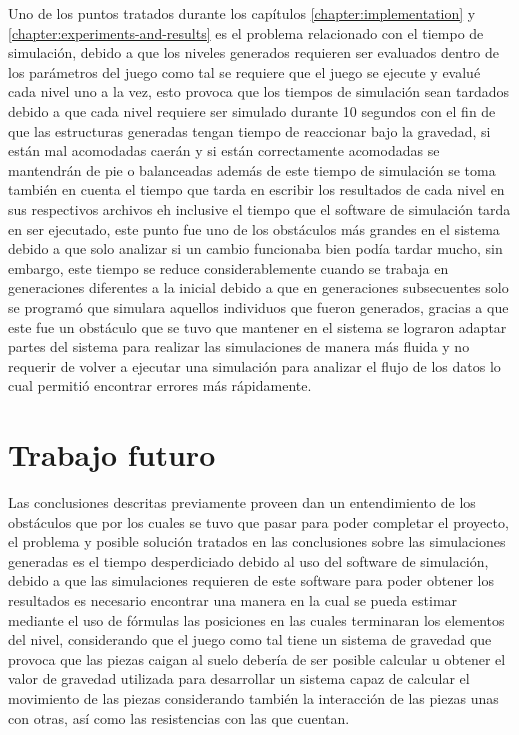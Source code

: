 Uno de los puntos tratados durante los capítulos \ref{chapter:implementation}
y \ref{chapter:experiments-and-results} es el problema relacionado con el tiempo
de simulación, debido a que los niveles generados requieren ser evaluados dentro
de los parámetros del juego como tal se requiere que el juego se ejecute y
evalué cada nivel uno a la vez, esto provoca que los tiempos de simulación sean
tardados debido a que cada nivel requiere ser simulado durante 10 segundos con
el fin de que las estructuras generadas tengan tiempo de reaccionar bajo la
gravedad, si están mal acomodadas caerán y si están correctamente acomodadas se
mantendrán de pie o balanceadas además de este tiempo de simulación se toma
también en cuenta el tiempo que tarda en escribir los resultados de cada nivel
en sus respectivos archivos eh inclusive el tiempo que el software de simulación
tarda en ser ejecutado, este punto fue uno de los obstáculos más grandes en el
sistema debido a que solo analizar si un cambio funcionaba bien podía tardar
mucho, sin embargo, este tiempo se reduce considerablemente cuando se trabaja en
generaciones diferentes a la inicial debido a que en generaciones subsecuentes
solo se programó que simulara aquellos individuos que fueron generados, gracias
a que este fue un obstáculo que se tuvo que mantener en el sistema se lograron
adaptar partes del sistema para realizar las simulaciones de manera más fluida y
no requerir de volver a ejecutar una simulación para analizar el flujo de los
datos lo cual permitió encontrar errores más rápidamente.

\section{Trabajo futuro}
\label{section:future-work}

Las conclusiones descritas previamente proveen dan un entendimiento de los
obstáculos que por los cuales se tuvo que pasar para poder completar el
proyecto, el problema y posible solución tratados en las conclusiones sobre las
simulaciones generadas es el tiempo desperdiciado debido al uso del software de
simulación, debido a que las simulaciones requieren de este software para poder
obtener los resultados es necesario encontrar una manera en la cual se pueda
estimar mediante el uso de fórmulas las posiciones en las cuales terminaran los
elementos del nivel, considerando que el juego como tal tiene un sistema de
gravedad que provoca que las piezas caigan al suelo debería de ser posible
calcular u obtener el valor de gravedad utilizada para desarrollar un sistema
capaz de calcular el movimiento de las piezas considerando también la
interacción de las piezas unas con otras, así como las resistencias con las que
cuentan.

